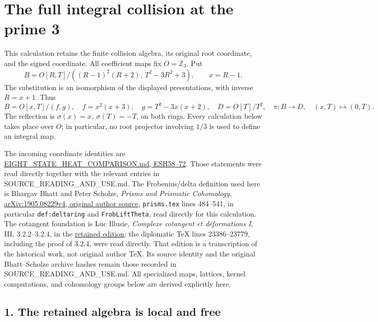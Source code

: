 \documentclass[
]{article}
\author{}
\date{}
\begin{document}
\section{The full integral collision at the prime
3}\label{the-full-integral-collision-at-the-prime-3}

This calculation retains the finite collision algebra, its original root
coordinate, and the signed coordinate. All coefficient maps fix
\(O=\mathbb Z_3\). Put \[
B=O[R,T]/((R-1)^2(R+2),\ T^2-3R^2+3),\qquad x=R-1.
\tag{P3-1}
\] The substitution is an isomorphism of the displayed presentations,
with inverse \(R=x+1\). Thus \[
B=O[x,T]/(f,g),\quad f=x^2(x+3),\quad
g=T^2-3x(x+2),\quad D=O[T]/T^2,
\quad\pi:B\longrightarrow D,\quad(x,T)\longmapsto(0,T).
\tag{P3-2}
\] The reflection is \(\sigma(x)=x,\ \sigma(T)=-T\), on both rings.
Every calculation below takes place over \(O\); in particular, no root
projector involving \(1/3\) is used to define an integral map.

The incoming coordinate identities are
\href{https://github.com/KokunoYumeto/zeta-function-research-reader/blob/d5c9d198a8432e3ede468b280162a99c00e3f4f7/workbenches/splitzero-tandem/branches/tau-zero-prime-positivity/EIGHT_STATE_HEAT_COMPARISON.md}{EIGHT\_STATE\_HEAT\_COMPARISON.md,
ESH58--72}. Those statements were read directly together with the
relevant entries in SOURCE\_READING\_AND\_USE.md. The Frobenius/delta
definition used here is Bhargav Bhatt and Peter Scholze, \emph{Prisms
and Prismatic Cohomology},
\href{https://arxiv.org/src/1905.08229v4}{arXiv:1905.08229v4, original
author source}, \texttt{prisms.tex} lines 484--541, in particular
\texttt{def:deltaring} and \texttt{FrobLiftTheta}, read directly for
this calculation. The cotangent foundation is Luc Illusie,
\emph{Complexe cotangent et déformations I}, III, 3.2.2--3.2.4, in the
\href{https://zenodo.org/records/22884471}{retained edition}; the
diplomatic TeX lines 23386--23779, including the proof of 3.2.4, were
read directly. That edition is a transcription of the historical work,
not original author TeX. Its source identity and the original
Bhatt--Scholze archive hashes remain those recorded in
SOURCE\_READING\_AND\_USE.md. All specialized maps, lattices, kernel
computations, and cohomology groups below are derived explicitly here.

\subsection{1. The retained algebra is local and
free}\label{the-retained-algebra-is-local-and-free}
\end{document}
